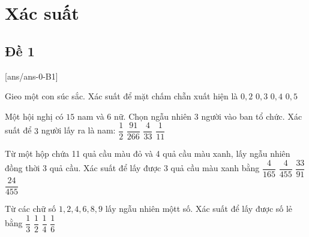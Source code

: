 \section{Xác suất}

\subsection{Đề 1}
[ans/ans-0-B1]
\caulc
\begin{ex}%
	Gieo một con súc sắc. Xác suất để mặt chấm chẵn xuất hiện là
	\choice
	{$0{,}2$}
	{$0{,}3$}
	{$0{,}4$}
	{\True $0{,}5$}
\end{ex}
\begin{ex}%
	Một hội nghị có $15$ nam và $6$ nữ. Chọn ngẫu nhiên $3$ người vào ban tổ chức. Xác suất để $3$ người lấy ra là nam:
	\choice
	{$\dfrac{1}{2}$}
	{\True $\dfrac{91}{266}$}
	{$\dfrac{4}{33}$}
	{$\dfrac{1}{11}$}
\end{ex}
\begin{ex}%
	Từ một hộp chứa 11 quả cầu màu đỏ và 4 quả cầu màu xanh, lấy ngẫu nhiên đồng thời 3 quả cầu. Xác suất để lấy được 3 quả cầu màu xanh bằng
	\choice
	{$\dfrac{4}{165}$}
	{\True $\dfrac{4}{455}$}
	{$\dfrac{33}{91}$}
	{$\dfrac{24}{455}$}
\end{ex}
\begin{ex}%
	Từ các chữ số $1, 2, 4, 6, 8, 9$ lấy ngẫu nhiên mộtt số. Xác suất để lấy được số lẻ bằng
	\choice
	{\True $\dfrac{1}{3}$}
	{$\dfrac{1}{2}$}
	{$\dfrac{1}{4}$}
	{$\dfrac{1}{6}$}
\end{ex}
